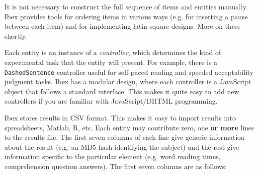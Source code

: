 \documentclass[
]{article}
\begin{document}
It is not necessary to construct the full sequence of items and entities
manually. Ibex provides tools for ordering items in various ways (e.g.
for inserting a pause between each item) and for implementing latin
square designs. More on these shortly.

Each entity is an instance of a \emph{controller}, which determines the
kind of experimental task that the entity will present. For example,
there is a \texttt{DashedSentence} controller useful for self-paced
reading and speeded acceptability judgment tasks. Ibex has a modular
design, where each controller is a JavaScript object that follows a
standard interface. This makes it quite easy to add new controllers if
you are familiar with JavaScript/DHTML programming.

Ibex stores results in CSV format. This makes it easy to import results
into spreadsheets, Matlab, R, etc. Each entity may contribute zero, one
\textbf{or more} lines to the results file. The first seven columns of
each line give generic information about the result (e.g. an MD5 hash
identifying the subject) and the rest give information specific to the
particular element (e.g. word reading times, comprehension question
answers). The first seven columns are as follows:
\end{document}
